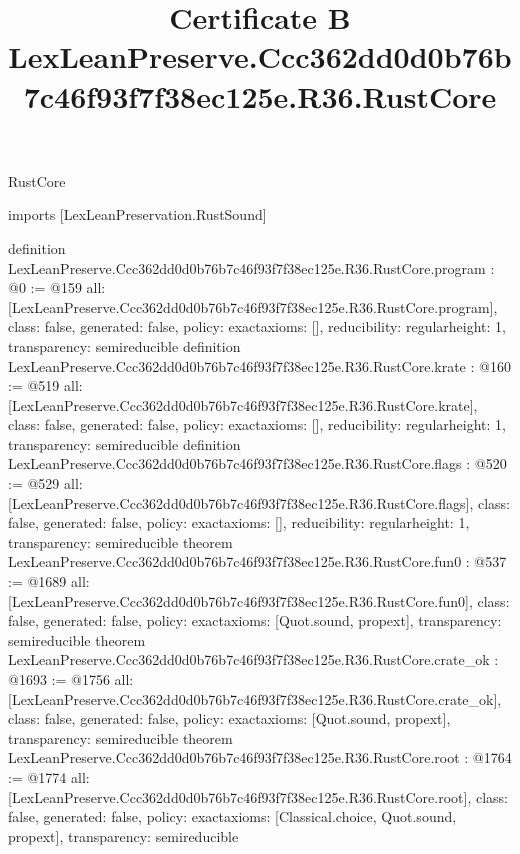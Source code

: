 \begin{lexlean}{RustCore}
\title{Certificate B LexLeanPreserve.Ccc362dd0d0b76b7c46f93f7f38ec125e.R36.RustCore}
\begin{coremodule}
imports [LexLeanPreservation.RustSound]

definition LexLeanPreserve.Ccc362dd0d0b76b7c46f93f7f38ec125e.R36.RustCore.program : @0 := @159 {
  all: [LexLeanPreserve.Ccc362dd0d0b76b7c46f93f7f38ec125e.R36.RustCore.program],
  class: false,
  generated: false,
  policy: exact{axioms: []},
  reducibility: regular{height: 1},
  transparency: semireducible
}
definition LexLeanPreserve.Ccc362dd0d0b76b7c46f93f7f38ec125e.R36.RustCore.krate : @160 := @519 {
  all: [LexLeanPreserve.Ccc362dd0d0b76b7c46f93f7f38ec125e.R36.RustCore.krate],
  class: false,
  generated: false,
  policy: exact{axioms: []},
  reducibility: regular{height: 1},
  transparency: semireducible
}
definition LexLeanPreserve.Ccc362dd0d0b76b7c46f93f7f38ec125e.R36.RustCore.flags : @520 := @529 {
  all: [LexLeanPreserve.Ccc362dd0d0b76b7c46f93f7f38ec125e.R36.RustCore.flags],
  class: false,
  generated: false,
  policy: exact{axioms: []},
  reducibility: regular{height: 1},
  transparency: semireducible
}
theorem LexLeanPreserve.Ccc362dd0d0b76b7c46f93f7f38ec125e.R36.RustCore.fun0 : @537 := @1689 {
  all: [LexLeanPreserve.Ccc362dd0d0b76b7c46f93f7f38ec125e.R36.RustCore.fun0],
  class: false,
  generated: false,
  policy: exact{axioms: [Quot.sound, propext]},
  transparency: semireducible
}
theorem LexLeanPreserve.Ccc362dd0d0b76b7c46f93f7f38ec125e.R36.RustCore.crate_ok : @1693 := @1756 {
  all: [LexLeanPreserve.Ccc362dd0d0b76b7c46f93f7f38ec125e.R36.RustCore.crate_ok],
  class: false,
  generated: false,
  policy: exact{axioms: [Quot.sound, propext]},
  transparency: semireducible
}
theorem LexLeanPreserve.Ccc362dd0d0b76b7c46f93f7f38ec125e.R36.RustCore.root : @1764 := @1774 {
  all: [LexLeanPreserve.Ccc362dd0d0b76b7c46f93f7f38ec125e.R36.RustCore.root],
  class: false,
  generated: false,
  policy: exact{axioms: [Classical.choice, Quot.sound, propext]},
  transparency: semireducible
}


\end{coremodule}
\end{lexlean}
